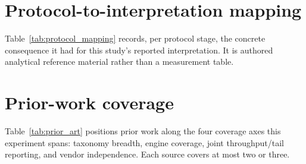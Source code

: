 \documentclass[11pt,a4paper]{article}
\newcommand{\tabledir}{tables/}
\begin{document}
\section{Protocol-to-interpretation mapping}
\label{sup:protocol-mapping}
Table~\ref{tab:protocol_mapping} records, per protocol stage, the concrete consequence it had
for this study's reported interpretation. It is authored analytical reference material rather
than a measurement table.





\section{Prior-work coverage}
\label{sup:prior-art}
Table~\ref{tab:prior_art} positions prior work along the four coverage axes this experiment
spans: taxonomy breadth, engine coverage, joint throughput/tail reporting, and vendor
independence. Each source covers at most two or three.
\end{document}
